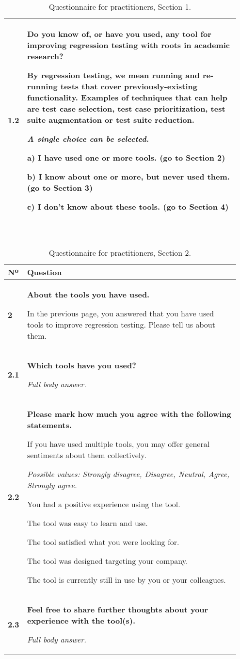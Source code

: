 \begin{table}[h!]
\begin{tabular}{p{0.05\linewidth}p{0.9\linewidth}}
\textbf{1.2} & \textbf{Do you know of, or have you used, any tool for improving regression testing with roots in academic research?}

By regression testing, we mean running and re-running tests that cover previously-existing functionality. Examples of techniques that can help are test case selection, test case prioritization, test suite augmentation or test suite reduction.

\textit{A single choice can be selected.}

a) I have used one or more tools. (go to Section 2)

b) I know about one or more, but never used them. (go to Section 3)

c) I don't know about these tools. (go to Section 4) \\
\bottomrule
\end{tabular}\\
\caption{Questionnaire for practitioners, Section 1.}
\label{table:interview_questions}
\end{table}


\begin{table}[]
\centering
\small
{}
\begin{tabular}{p{0.05\linewidth}p{0.9\linewidth}}
\toprule
\textbf{Nº} & \textbf{Question} \\
\midrule
\textbf{2} & \textbf{About the tools you have used.} 

In the previous page, you answered that you have used tools to improve regression testing. Please tell us about them.	\\

\textbf{2.1} & \textbf{Which tools have you used?}

\textit{Full body answer.}\\

\textbf{2.2} & \textbf{Please mark how much you agree with the following statements.}

If you have used multiple tools, you may offer general sentiments about them collectively.

\textit{Possible values: Strongly disagree, Disagree, Neutral, Agree, Strongly agree.}

You had a positive experience using the tool.

The tool was easy to learn and use.

The tool satisfied what you were looking for.

The tool was designed targeting your company.

The tool is currently still in use by you or your colleagues. \\

\textbf{2.3} & \textbf{Feel free to share further thoughts about your experience with the tool(s).}

\textit{Full body answer.}\\
\bottomrule
\end{tabular}\\
\caption{Questionnaire for practitioners, Section 2.}
\label{table:interview_questions}
\end{table}


